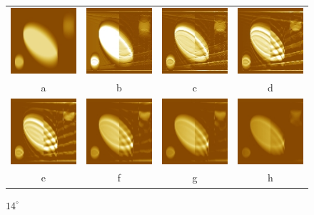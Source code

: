 \documentclass{procDDs}
\begin{document}
\begin{figure}[h!]\center%
	\begin{tabular}{cccc}
		\includegraphics[width=0.2\linewidth]{img/13/1.jpg}&
		\includegraphics[width=0.2\linewidth]{img/13/3.jpg}&
		\includegraphics[width=0.2\linewidth]{img/13/4.jpg}&
		\includegraphics[width=0.2\linewidth]{img/13/5.jpg}\\
		a & b & c & d\\
		\includegraphics[width=0.2\linewidth]{img/13/6.jpg}&
		\includegraphics[width=0.2\linewidth]{img/13/7.jpg}&
		\includegraphics[width=0.2\linewidth]{img/13/8.jpg}&
		\includegraphics[width=0.2\linewidth]{img/13/9.jpg}\\
		e & f & g & h
	\end{tabular}
	\caption{$14^\circ$}
	\label{ris:desc5}
\end{figure}
\end{document}
